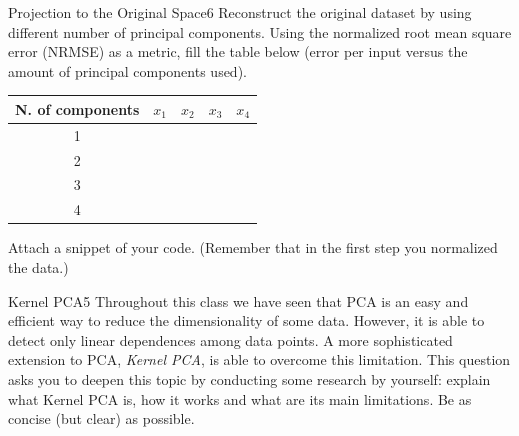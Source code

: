 \begin{questions}
\begin{question}{Projection to the Original Space}{6}
Reconstruct the original dataset by using different number of principal components. Using the normalized root mean square error (NRMSE) as a metric, fill the table below (error per input versus the amount of principal components used).

\begin{tabular}{c|r|r|r|r}
N. of components & $x_1$ & $x_2$ & $x_3$ & $x_4$ \\
\hline
1 & & & & \\
2 & & & & \\
3 & & & & \\
4 & & & &
\end{tabular}

Attach a snippet of your code.
(Remember that in the first step you normalized the data.)

\begin{answer}\end{answer}
\end{question}

\begin{question}[bonus]{Kernel PCA}{5}
Throughout this class we have seen that PCA is an easy and efficient way to reduce the dimensionality of some data. However, it is able to detect only linear dependences among data points. A more sophisticated extension to PCA, \emph{Kernel PCA}, is able to overcome this limitation. 
This question asks you to deepen this topic by conducting some research by yourself: explain what Kernel PCA is, how it works and what are its main limitations. Be as concise (but clear) as possible.

\begin{answer}\end{answer}
\end{question}

\end{questions}
